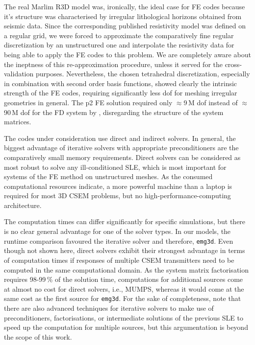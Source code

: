 \documentclass[
    paper,
  ]{geophysics}
\newcommand{\emg}[2]{\texttt{emg#1#2}\xspace}
\begin{document}
The real Marlim R3D model was, ironically, the ideal case for FE codes because it's structure was characterised by irregular lithological horizons obtained from seismic data. Since the corresponding published resistivity model was defined on a regular grid, we were forced to approximate the comparatively fine regular discretization by an unstructured one and interpolate the resistivity data for being able to apply the FE codes to this problem. We are completely aware about the ineptness of this re-approximation procedure, unless it served for the cross-validation purposes. Nevertheless, the chosen tetrahedral discretization, especially in combination with second order basis functions, showed clearly the intrinsic strength of the FE codes, requiring significantly less dof for meshing irregular geometries in general. The p2 FE solution required only $\approx$9\,M dof instead of $\approx$90\,M dof for the FD system by \citet{GEO.19.Correa}, disregarding the structure of the system matrices.

The codes under consideration use direct and indirect solvers. In general, the biggest advantage of iterative solvers with appropriate preconditioners are the comparatively small memory requirements. Direct solvers can be considered as most robust to solve any ill-conditioned SLE, which is most important for systems of the FE method on unstructured meshes. As the consumed computational resources indicate, a more powerful machine than a laptop is required for most 3D CSEM problems, but no high-performance-computing architecture.

The computation times can differ significantly for specific simulations, but there is no clear general advantage for one of the solver types. In our models, the runtime comparison favoured the iterative solver and therefore, \emg3d. Even though not shown here, direct solvers exhibit their strongest advantage in terms of computation times if responses of multiple CSEM transmitters need to be computed in the same computational domain. As the system matrix factorisation requires 98-99\,\% of the solution time, computations for additional sources come at almost no cost for direct solvers, i.e., MUMPS, whereas it would come at the same cost as the first source for \emg3d. For the sake of completeness, note that there are also advanced techniques for iterative solvers to make use of preconditioners, factorisations, or intermediate solutions of the previous SLE to speed up the computation for multiple sources, but this argumentation is beyond the scope of this work.
\end{document}
